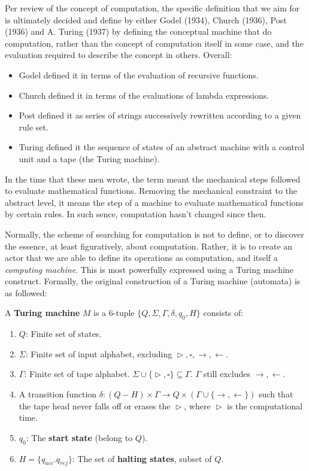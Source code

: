 Per review of the concept of computation, the specific definition that we aim for is ultimately decided and define by either Godel (1934), Church (1936), Post (1936) and A. Turing (1937) by defining the conceptual machine that do computation, rather than the concept of computation itself in some case, and the evaluation required to describe the concept in others. Overall: 
\begin{itemize}[topsep=1pt,itemsep=1pt]
    \item Godel defined it in terms of the evaluation of recursive functions. 
    \item Church defined it in terms of the evaluations of lambda expressions. 
    \item Post defined it as series of strings successively rewritten according to a given rule set. 
    \item Turing defined it the sequence of states of an abstract machine with a control unit and a tape (the Turing machine).  
\end{itemize}
In the time that these men wrote, the term meant the mechanical steps followed to evaluate mathematical functions. Removing the mechanical constraint to the abstract level, it means the step of a machine to evaluate mathematical functions by certain rules. In such sence, computation hasn't changed since then. 

Normally, the scheme of searching for computation is not to define, or to discover the essence, at least figuratively, about computation. Rather, it is to create an actor that we are able to define its operations as computation, and itself a \textit{computing machine}. This is most powerfully expressed using a Turing machine construct. Formally, the original construction of a Turing machine (automata) is as followed: 
\begin{definition}[TM]
    A \textbf{Turing machine} $M$ is a 6-tuple $\{Q,\Sigma,\Gamma, \delta, q_0, H\}$ consists of:
    \vspace{2mm}
    \begin{enumerate}[noitemsep]
        \item $Q$: Finite set of states. 
        \item $\Sigma$: Finite set of input alphabet, excluding $\vartriangleright, \square, \rightarrow, \leftarrow$. 
        \item $\Gamma$: Finite set of tape alphabet. $\Sigma \cup \{\vartriangleright, \square\}\subseteq \Gamma$. $\Gamma$ still excludes $\rightarrow, \leftarrow$. 
        \item A transition function $\delta: (Q-H)\times \Gamma \to Q\times (\Gamma \cup \{\rightarrow, \leftarrow\})$ such that the tape head never falls off or erases the $\vartriangleright$, where $\vartriangleright$ is the computational time.
        \item $q_0$: The \textbf{start state} (belong to $Q$). 
        \item $H=\{q_{acc}. q_{rej}\}$: The set of \textbf{halting states}, subset of $Q$. 
    \end{enumerate}
\end{definition}


